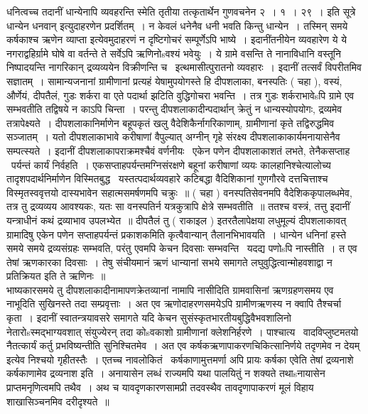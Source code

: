 \documentclass[11pt, openany]{book}
\begin{document}
धनित्वच्च तदानीं धान्येनापि व्यवहरन्ति स्मेति तृतीया तत्कृतार्थेन गुणवचनेन २~। १~। २९~। इति सूत्रे {\qt धान्येन धनवान्} इत्युदाहरणेन प्रदर्शितम्~। न केवलं धनेनैव धनी भवति किन्तु धान्येन~। तस्मिन् समये कर्षकाश्च ऋणेन व्याप्ता इत्येवमुदाहरणं न दृष्टिगोचरं सम्पूर्णेऽपि भाष्ये~। इदानींतनीयेन व्यवहारेण ये ये नगराद्वहिर्ग्रामे घोषे वा वर्तन्ते ते सर्वेऽपि ऋणिनोsवश्यं भवेयुः~। ये ग्रामे वसन्ति ते नानाविधानि वस्तूनि निष्पादयन्ति नागरिकान् द्रव्यव्ययेन विक्रीणन्ति च \textendash\ इत्थमासीत्पुरातनो व्यवहारः~। इदानीं तत्सर्वं विपरीतमिव सज्ञातम्~। सामान्यजनानां ग्रामीणानां प्रत्यहं येषामुपयोगस्ते हि दीपशलाका, बनस्पतिः ( चहा ), वस्यं, और्णेयं, दीपतैलं, गुडः शर्करा वा एते पदार्था झटिति वुद्धिगोचरा भवन्ति~। तत्र गुडः शर्कराभावेsपि ग्रामे एव सम्भवतीति तद्विषये न काऽपि चिन्ता~। परन्तु दीपशलाकादीन्पदार्थान् क्रेतुं न धान्यस्योपयोगः, द्रव्यमेव तत्रापेक्ष्यते~। दीपशलाकानिर्माणेन बहूपकृतं खलु वैदेशिकैर्नागरिकाणाम्, ग्रामीणानां कृते तद्विरुद्धमिव सञ्जातम्~। यतो दीपशलाकाभावे करीषाणां वैपुल्यात् अग्नीन् गृहे संरक्ष्य दीपशलाकाकार्यमनायासेनैव सम्पत्स्यते~। इदानीं दीपशलाकापराक्रमश्चैवं वर्णनीयः \textendash\ एकेन पणेन दीपशलाकाशतं लभते, तेनैकसप्ताह \textendash\ पर्यन्तं कार्यं निर्वहति~। एकसप्ताहपर्यन्तमग्निसंरक्षणे बहूनां करीषाणां व्ययः कालहानिश्चेत्यालोच्य तादृशपदार्थनिर्माणेन विस्मितबुद्ध \textendash\ यस्तत्पदार्थव्यवहारे कटिबद्धा वैदिशिकानां गुणगौरवे दत्तचित्ताश्च विस्मृतस्ववृत्तयो दास्यभावेन सहात्मसमर्षणमपि चक्रुः~॥ ( चहा ) वनस्पतिसेवनमपि वैदेशिककृपालब्धमेव, तत्र तु द्रव्यव्यय आवश्यकः, यतः सा वनस्पतिर्न यत्रकुत्रापि क्षेत्रे सम्भवतीति~॥ ततश्च वस्त्रं, तत्तु इदानीं यन्त्राधीनं कथं द्रव्याभाव उपलभ्येत~॥ दीपतैलं तु ( राकाइल ) इतरतैलापेक्षया लधुमूल्यं दीपशलाकावत् ग्रामादिषु एकेन पणेन सप्ताहपर्यन्तं प्रकाशकमिति कृत्वैवान्यान् तैलानभिभावयति~। धान्येन धनिनां हस्ते समये समये द्रव्यसंग्रहः सम्भवति, परंतु एवमपि केचन दिवसाः सम्भवन्ति \textendash\ यदद्य पणोsपि नास्तीति~। त एव तेषां ऋणकारका दिवसाः~। तेषु संचीयमानं ऋणं धान्यानां सभये समागते लघुवुद्धित्वान्मोहवशाद्वा न प्रतिक्रियत इति ते ऋणिनः~॥\\

भाष्यकारसमये तु दीपशलाकादीनामापणक्रेतव्यानां नामापि नासीदिति ग्रामवासिनां ऋणग्रहणसमय एव नाभूदिति सुखिनस्ते तदा सम्प्रवृत्ताः~। अत एव ऋणोदाहरणसमयेऽपि ग्रामीणऋणस्य न क्वापि तैश्चर्चा कृता~। इदानीं स्वातन्त्रयावसरे समागते यदि केचन सुसंस्कृतभारतीयबुद्धिवैभवशालिनो नेतारोsस्मद्भाग्यवशात् संयुज्येरन् तदा कोsवकाशो ग्रामीणानां क्लेशनिर्हरणे~। पाश्चात्य \textendash\ वादविप्लुष्टमतयो नैतत्कार्यं कर्तु प्रभविष्यन्तीति सुनिश्चितमेव~। अत एव कर्षकऋणापाकरणचिकित्सानिर्णये {\qt तदृणमेव न देयम्} इत्येव निश्चयो गृहीतस्तैः~। एतच्च नावलोकितं \textendash\ कर्षकाणामुत्तमर्णा अपि प्रायः कर्षका एवेति तेषां द्रव्यनाशे कर्षकाणामेव द्रव्यनाश इति~। अनायासेन लब्धं राज्यमपि यथा पालयितुं न शक्यते तथाsनायासेन प्राप्तमनृणित्वमपि तथैव~। अथ च यावदृणकारणसामप्री तदवस्थैव तावदृणापाकरणं मूलं विहाय शाखासिञ्चनमिव दरीदृश्यते~॥
\end{document}

